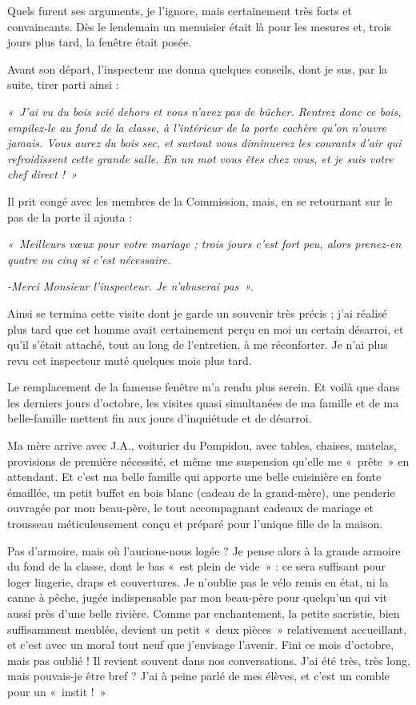Quels furent ses arguments, je l’ignore, mais certainement très forts et convaincants. Dès le
lendemain un menuisier était là pour les mesures et, trois jours plus tard, la fenêtre était posée.

Avant son départ, l’inspecteur me donna quelques conseils, dont je sus, par la suite, tirer
parti ainsi :

\textit{«~J’ai vu du bois scié dehors et vous n’avez pas de bûcher. Rentrez donc ce bois, empilez-le
au fond de la classe, à l’intérieur de la porte cochère qu’on n’ouvre jamais. Vous aurez du bois
sec, et surtout vous diminuerez les courants d’air qui refroidissent cette grande salle. En un
mot vous êtes chez vous, et je suis votre chef direct !~»}

Il prit congé avec les membres de la Commission, mais, en se retournant sur le pas de la porte
il ajouta :

\textit{«~Meilleurs vœux pour votre mariage ; trois jours c’est fort peu, alors prenez-en quatre ou
cinq si c’est nécessaire.}

\textit{-Merci Monsieur l’inspecteur. Je n’abuserai pas~».}

Ainsi se termina cette visite dont je garde un souvenir très précis ; j’ai réalisé plus tard que cet
homme avait certainement perçu en moi un certain désarroi, et qu’il s’était attaché, tout au
long de l’entretien, à me réconforter. Je n’ai plus revu cet inspecteur muté quelques mois plus
tard.


Le remplacement de la fameuse fenêtre m’a rendu plus serein. Et voilà que dans les derniers
jours d’octobre, les visites quasi simultanées de ma famille et de ma belle-famille mettent fin
aux jours d’inquiétude et de désarroi.

Ma mère arrive avec J.A., voiturier du Pompidou, avec tables, chaises, matelas, provisions de
première nécessité, et même une suspension qu’elle me «~prête~» en attendant. Et c’est ma
belle famille qui apporte une belle cuisinière en fonte émaillée, un petit buffet en bois blanc
(cadeau de la grand-mère), une penderie ouvragée par mon beau-père, le tout accompagnant
cadeaux de mariage et trousseau méticuleusement conçu et préparé pour l’unique fille de la
maison.

Pas d’armoire, mais où l’aurions-nous logée ? Je pense alors à la grande armoire du fond de la
classe, dont le bas «~est plein de vide~» : ce sera suffisant pour loger lingerie, draps et
couvertures.
Je n’oublie pas le vélo remis en état, ni la canne à pêche, jugée indispensable par mon beau-père pour quelqu’un qui vit aussi près d’une belle rivière.
Comme par enchantement, la petite sacristie, bien suffisamment meublée, devient un petit
«~deux pièces~» relativement accueillant, et c’est avec un moral tout neuf que j’envisage
l’avenir.
Fini ce mois d’octobre, mais pas oublié ! Il revient souvent dans nos conversations. J’ai été
très, très long, mais pouvais-je être bref ? J’ai à peine parlé de mes élèves, et c’est un comble
pour un «~instit !~»

